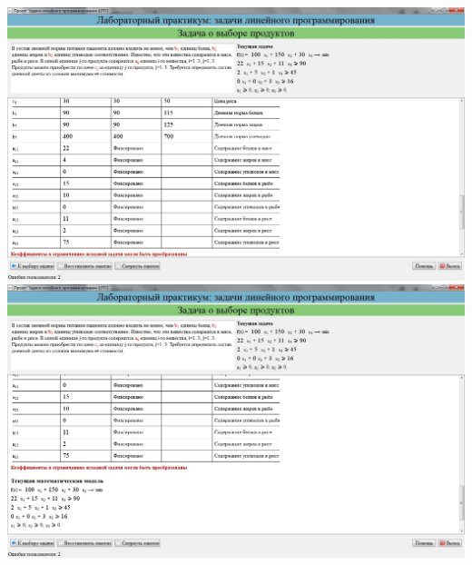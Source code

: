 \includegraphics[width=\linewidth]{om_hw_02/images/4_4.jpg}\\
\includegraphics[width=\linewidth]{om_hw_02/images/4_5.jpg}\\

\pagebreak
